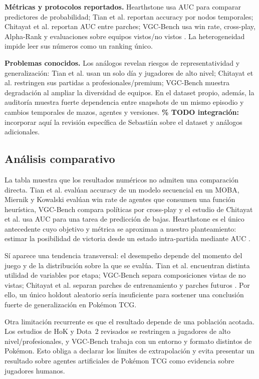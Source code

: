 \noindent\textbf{Métricas y protocolos reportados.} Hearthstone usa AUC
para comparar predictores de probabilidad; Tian et al. reportan
accuracy por nodos temporales; Chitayat et al. reportan AUC entre
parches; VGC-Bench usa win rate, cross-play, Alpha-Rank y evaluaciones
sobre equipos vistos/no vistos \cite{janusz_hearthstone_2017,tian_hero_2022,chitayat_meta_2023,angliss_vgcbench_2026}. La heterogeneidad impide
leer sus números como un ranking único.

\noindent\textbf{Problemas conocidos.} Los análogos revelan riesgos de
representatividad y generalización: Tian et al. usan un solo día y
jugadores de alto nivel; Chitayat et al. restringen sus partidas a
profesionales/premium; VGC-Bench muestra degradación al ampliar la
diversidad de equipos. En el dataset propio, además, la auditoría
muestra fuerte dependencia entre snapshots de un mismo episodio y
cambios temporales de mazos, agentes y versiones. \textbf{\% TODO
integración:} incorporar aquí la revisión específica de Sebastián sobre
el dataset y análogos adicionales.

\subsection{Análisis comparativo}
\label{subsec:comparativo}


La tabla muestra que los resultados numéricos no admiten una
comparación directa. Tian et al. evalúan accuracy de un modelo
secuencial en un MOBA, Miernik y Kowalski evalúan win rate de agentes
que consumen una función heurística, VGC-Bench compara políticas por
cross-play y el estudio de Chitayat et al. usa AUC para una tarea de
predicción de bajas. Hearthstone es el único antecedente cuyo objetivo
y métrica se aproximan a nuestro planteamiento: estimar la posibilidad
de victoria desde un estado intra-partida mediante AUC
\cite{janusz_hearthstone_2017}.

Sí aparece una tendencia transversal: el desempeño depende del
momento del juego y de la distribución sobre la que se evalúa. Tian et
al. encuentran distinta utilidad de variables por etapa;
VGC-Bench separa composiciones vistas de no vistas; Chitayat et al.
separan parches de entrenamiento y parches futuros
\cite{tian_hero_2022,angliss_vgcbench_2026,chitayat_meta_2023}. Por ello,
un único holdout aleatorio sería insuficiente para sostener una
conclusión fuerte de generalización en Pokémon TCG.

Otra limitación recurrente es que el resultado depende de una
población acotada. Los estudios de HoK y Dota~2 revisados se restringen
a jugadores de alto nivel/profesionales, y VGC-Bench trabaja con un
entorno y formato distintos de Pokémon. Esto obliga a declarar los
límites de extrapolación y evita presentar un resultado sobre agentes
artificiales de Pokémon TCG como evidencia sobre jugadores humanos.

